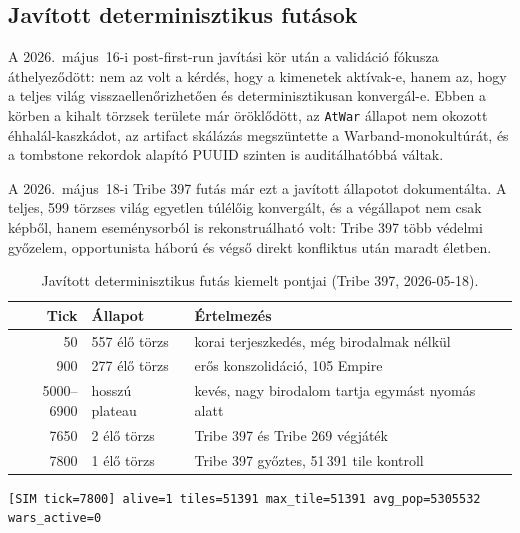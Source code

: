 ﻿\documentclass[a4paper,12pt]{report}
\begin{document}
\subsection*{Javított determinisztikus futások}

A 2026.~május~16-i post-first-run javítási kör után a validáció fókusza áthelyeződött:
nem az volt a kérdés, hogy a kimenetek aktívak-e, hanem az, hogy a teljes világ
visszaellenőrizhetően és determinisztikusan konvergál-e. Ebben a körben a kihalt törzsek
területe már öröklődött, az \texttt{AtWar} állapot nem okozott éhhalál-kaszkádot,
az artifact skálázás megszüntette a Warband-monokultúrát, és a tombstone rekordok
alapító PUUID szinten is auditálhatóbbá váltak.

A 2026.~május~18-i Tribe 397 futás már ezt a javított állapotot dokumentálta. A teljes,
599 törzses világ egyetlen túlélőig konvergált, és a végállapot nem csak képből, hanem
eseménysorból is rekonstruálható volt: Tribe 397 több védelmi győzelem, opportunista
háború és végső direkt konfliktus után maradt életben.

\begin{table}[h]
\centering
\caption{Javított determinisztikus futás kiemelt pontjai (Tribe 397, 2026-05-18).}
\label{tab:tribe397-validation}
\begin{tabular}{rlp{7.2cm}}
\hline
\textbf{Tick} & \textbf{Állapot} & \textbf{Értelmezés} \\
\hline
50   & 557 élő törzs & korai terjeszkedés, még birodalmak nélkül \\
900  & 277 élő törzs & erős konszolidáció, 105 Empire \\
5000--6900 & hosszú plateau & kevés, nagy birodalom tartja egymást nyomás alatt \\
7650 & 2 élő törzs & Tribe 397 és Tribe 269 végjáték \\
7800 & 1 élő törzs & Tribe 397 győztes, 51\,391 tile kontroll \\
\hline
\end{tabular}
\end{table}

\begin{lstlisting}[language={},caption={Javított végállapot-részlet a Tribe 397 futásból}]
[SIM tick=7800] alive=1 tiles=51391 max_tile=51391 avg_pop=5305532 wars_active=0
\end{lstlisting}
\end{document}
